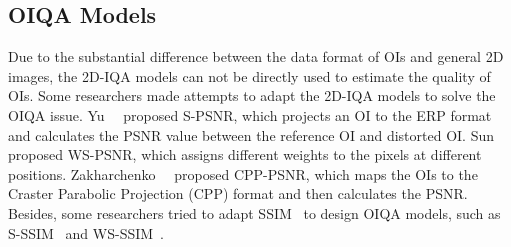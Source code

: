 \subsection{OIQA Models}

Due to the substantial difference between the data format of OIs and general 2D images, the 2D-IQA models can not be directly used to estimate the quality of OIs. Some researchers made attempts to adapt the 2D-IQA models to solve the OIQA issue. Yu~\et~\cite{yu2015framework} proposed S-PSNR, which projects an OI to the ERP format and calculates the PSNR value between the reference OI and distorted OI. Sun~\et~\cite{sun2017weighted} proposed WS-PSNR, which assigns different weights to the pixels at different positions. Zakharchenko~\et~\cite{zakharchenko2016quality} proposed CPP-PSNR, which maps the OIs to the Craster Parabolic Projection (CPP) format and then calculates the PSNR. Besides, some researchers tried to adapt SSIM~\cite{wang2004image} to design OIQA models, such as S-SSIM~\cite{chen2018spherical} and WS-SSIM~\cite{zhou2018weighted}. 



